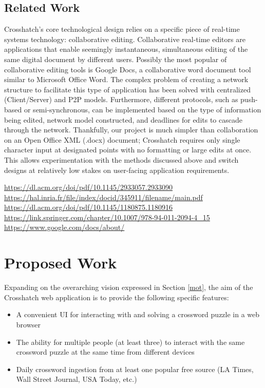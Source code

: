 \documentclass{article}
\begin{document}
\subsection{Related Work}
Crosshatch's core technological design relies on a specific piece of real-time systems technology: collaborative editing.
Collaborative real-time editors are applications that enable seemingly instantaneous, simultaneous editing 
of the same digital document by different users.
Possibly the most popular of collaborative editing tools is Google Docs, a collaborative
word document tool similar to Microsoft Office Word.
The complex problem of creating a network structure to facilitate this type of application has been solved with centralized (Client/Server)
and P2P models.
Furthermore, different protocols, such as push-based or semi-synchronous, can be implemented based on the type of information being edited,
network model constructed, and deadlines for edits to cascade through the network.
Thankfully, our project is much simpler than collaboration on an Open Office XML (.docx) document; Crosshatch requires only
single character input at designated points with no formatting or large edits at once. 
This allows experimentation with the methods discussed above and switch designs
at relatively low stakes on user-facing application requirements. 

\noindent
\url{https://dl.acm.org/doi/pdf/10.1145/2933057.2933090} \\
\url{https://hal.inria.fr/file/index/docid/345911/filename/main.pdf} \\
\url{https://dl.acm.org/doi/pdf/10.1145/1180875.1180916} \\
\url{https://link.springer.com/chapter/10.1007/978-94-011-2094-4\_15} \\
\url{https://www.google.com/docs/about/}

\section{Proposed Work}
Expanding on the overarching vision expressed in Section \ref{mot}, the aim of the Crosshatch web application is to provide the following
specific features:
\begin{itemize}
  \item A convenient UI for interacting with and solving a crossword puzzle in a web browser
  \item The ability for multiple people (at least three) to interact with the same crossword puzzle at the same time from different devices
  \item Daily crossword ingestion from at least one popular free source (LA Times, Wall Street Journal, USA Today, etc.)
\end{itemize}
\end{document}
